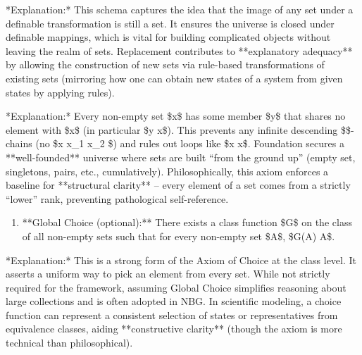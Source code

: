 \documentclass[11pt]{article}
\begin{document}
\begin{enumerate}
  \item **Replacement (Schema):** If \$F\$ is a definable class function and \$X\$ is a set, then \$F\[X] = {F(x) : x \in X}\$ is also a set.
\end{enumerate}
   *Explanation:* This schema captures the idea that the image of any set under a definable transformation is still a set. It ensures the universe is closed under definable mappings, which is vital for building complicated objects without leaving the realm of sets. Replacement contributes to **explanatory adequacy** by allowing the construction of new sets via rule-based transformations of existing sets (mirroring how one can obtain new states of a system from given states by applying rules).

\begin{enumerate}
  \item **Foundation (Regularity):** \$\forall x,\[x \neq \varnothing \rightarrow \exists y \in x:; x \cap y = \varnothing]\$.
\end{enumerate}
   *Explanation:* Every non-empty set \$x\$ has some member \$y\$ that shares no element with \$x\$ (in particular \$y \notin x\$). This prevents any infinite descending \$\in\$-chains (no \$x \ni x\_1 \ni x\_2 \ni \cdots\$) and rules out loops like \$x \in x\$. Foundation secures a **well-founded** universe where sets are built “from the ground up” (empty set, singletons, pairs, etc., cumulatively). Philosophically, this axiom enforces a baseline for **structural clarity** – every element of a set comes from a strictly “lower” rank, preventing pathological self-reference.

\begin{enumerate}
  \item **Global Choice (optional):** There exists a class function \$G\$ on the class of all non-empty sets such that for every non-empty set \$A\$, \$G(A) \in A\$.
\end{enumerate}
    *Explanation:* This is a strong form of the Axiom of Choice at the class level. It asserts a uniform way to pick an element from every set. While not strictly required for the framework, assuming Global Choice simplifies reasoning about large collections and is often adopted in NBG. In scientific modeling, a choice function can represent a consistent selection of states or representatives from equivalence classes, aiding **constructive clarity** (though the axiom is more technical than philosophical).
\end{document}
